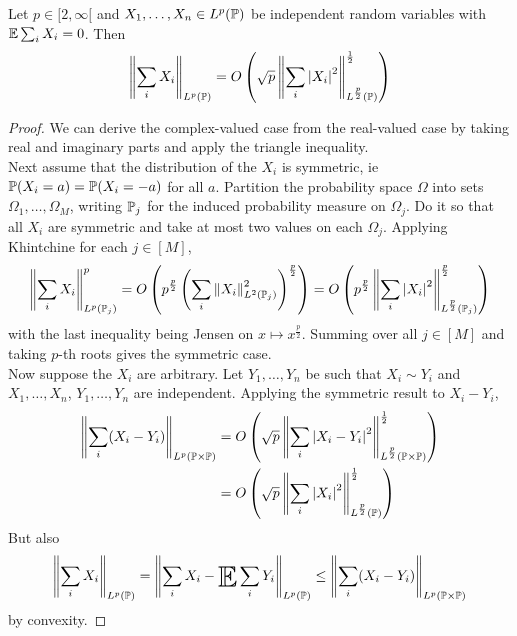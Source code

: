 \documentclass{article}
\begin{document}
\begin{nthm}
  Let $p \in [2, \infty[$ and $X_1, \dots, X_n \in L^p(\P)$ be independent random variables with $\E \sum_i X_i = 0$. Then
  $$\norm{\sum_i X_i}_{L^p(\P)} = O\left(\sqrt p \norm{\sum_i \abs{X_i}^2}_{L^{\frac p2}(\P)}^{\frac 12}\right)$$
\end{nthm}
\begin{proof}
  We can derive the complex-valued case from the real-valued case by taking real and imaginary parts and apply the triangle inequality. \\
  Next assume that the distribution of the $X_i$ is symmetric, ie $\P(X_i = a) = \P(X_i = -a)$ for all $a$. Partition the probability space $\Omega$ into sets $\Omega_1, \dots, \Omega_M$, writing $\P_j$ for the induced probability measure on $\Omega_j$. Do it so that all $X_i$ are symmetric and take at most two values on each $\Omega_j$. Applying Khintchine for each $j \in [M]$,
  $$\norm{\sum_i X_i}_{L^p(\P_j)}^p = O\left(p^{\frac p2} \left(\sum_i \norm{X_i}_{L^2(\P_j)}^2\right)^{\frac p2}\right) = O\left(p^{\frac p2} \norm{\sum_i \abs{X_i}^2}_{L^{\frac p2}(\P_j)}^{\frac p2}\right)$$
  with the last inequality being Jensen on $x \mapsto x^{\frac p2}$. Summing over all $j \in [M]$ and taking $p$-th roots gives the symmetric case. \\
  Now suppose the $X_i$ are arbitrary. Let $Y_1, \dots, Y_n$ be such that $X_i \sim Y_i$ and $X_1, \dots, X_n$, $Y_1, \dots, Y_n$ are independent. Applying the symmetric result to $X_i - Y_i$,
  \begin{align*}
    \norm{\sum_i (X_i - Y_i)}_{L^p(\P \times \P)}
    & = O\left(\sqrt p \norm{\sum_i \abs{X_i - Y_i}^2}_{L^{\frac p2}(\P \times \P)}^{\frac 12}\right) \\
    & = O\left(\sqrt p \norm{\sum_i \abs{X_i}^2}_{L^{\frac p2}(\P)}^{\frac 12}\right)
  \end{align*}
  But also
  $$\norm{\sum_i X_i}_{L^p(\P)} = \norm{\sum_i X_i - \E \sum_i Y_i}_{L^p(\P)} \le \norm{\sum_i (X_i - Y_i)}_{L^p(\P \times \P)}$$
  by convexity.
\end{proof}
\end{document}
